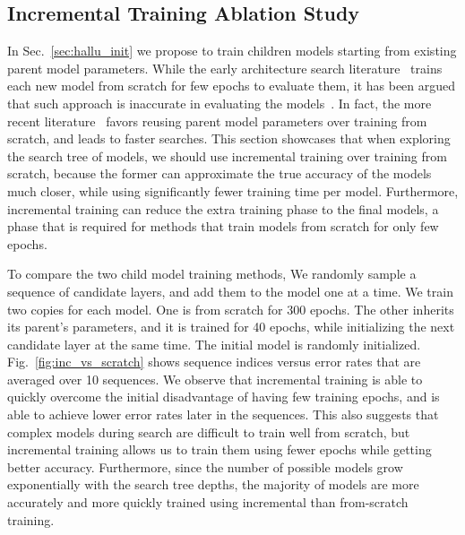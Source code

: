 \documentclass{article}
\begin{document}
\subsection{Incremental Training Ablation Study}
\label{sec:incremental_vs_from_scratch}
In Sec.~\ref{sec:hallu_init} we propose to train children models starting from existing parent model parameters. While the early architecture search literature~\citep{} trains each new model from scratch for few epochs to evaluate them, it has been argued that such approach is inaccurate in evaluating the models~\citep{}. In fact, the more recent literature~\citep{} favors reusing parent model parameters over training from scratch, and leads to faster searches. 
This section showcases that when exploring the search tree of models, we should use incremental training over training from scratch, because the former can approximate the true accuracy of the models much closer, while using significantly fewer training time per model. Furthermore, incremental training can reduce the extra training phase to the final models, a phase that is required for methods that train models from scratch for only few epochs.  

To compare the two child model training methods, We randomly sample a sequence of candidate layers, and add them to the model one at a time. We train two copies for each model. One is from scratch for 300 epochs. The other inherits its parent's parameters, and it is trained for 40 epochs, while initializing the next candidate layer at the same time. The initial model is randomly initialized. Fig.~\ref{fig:inc_vs_scratch} shows sequence indices versus error rates that are averaged over 10 sequences. We observe that incremental training is able to quickly overcome the initial disadvantage of having few training epochs, and is able to achieve lower error rates later in the sequences. This also suggests that complex models  during search are difficult to train well from scratch, but incremental training allows us to train them using fewer epochs while getting better accuracy. Furthermore, since the number of possible models grow exponentially with the search tree depths, the majority of models are more accurately and more quickly trained using incremental than from-scratch training.
\end{document}
